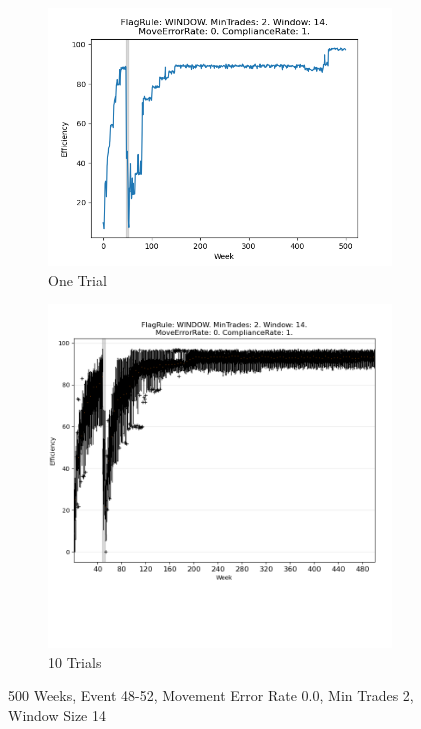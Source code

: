 \documentclass{article}%
\begin{document}
\begin{figure}[!htb]%
\begin{subfigure}[b]{0.45\linewidth}%
\includegraphics[width=\linewidth]{1053fr_WINDOW_mt_2_ws_14_er_0_cr_1_t1.png}%
\caption{One Trial}%
\end{subfigure}%
\begin{subfigure}[b]{0.45\linewidth}%
\includegraphics[clip,width=\linewidth,trim=0 4cm 0 0]{1053fr_WINDOW_mt_2_ws_14_er_0_cr_1_t10.png}%
\caption{10 Trials}%
\end{subfigure}%
\caption{500 Weeks, Event 48{-}52, Movement Error Rate 0.0, Min Trades 2, Window Size 14}%
\end{figure}
\end{document}
